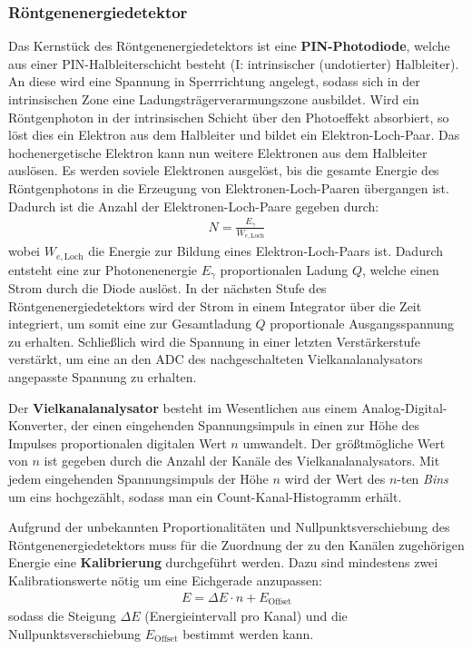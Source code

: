 \documentclass[11pt, a4paper]{article}
\begin{document}
\subsubsection{Röntgenenergiedetektor}
\label{sec:energiedetektor}

Das Kernstück des Röntgenenergiedetektors ist eine \textbf{PIN-Photodiode}, welche aus einer PIN-Halbleiterschicht besteht (I: intrinsischer (undotierter) Halbleiter).
An diese wird eine Spannung in Sperrrichtung angelegt, sodass sich in der intrinsischen Zone eine Ladungsträgerverarmungszone ausbildet.
Wird ein Röntgenphoton in der intrinsischen Schicht über den Photoeffekt absorbiert, so löst dies ein Elektron aus dem Halbleiter und bildet ein Elektron-Loch-Paar.
Das hochenergetische Elektron kann nun weitere Elektronen aus dem Halbleiter auslösen.
Es werden soviele Elektronen ausgelöst, bis die gesamte Energie des Röntgenphotons in die Erzeugung von Elektronen-Loch-Paaren übergangen ist.
Dadurch ist die Anzahl der Elektronen-Loch-Paare gegeben durch:
\begin{align}
  N = \frac{E_\gamma}{W_{e,\mathrm{Loch}}}
\end{align}
wobei $W_{e,\mathrm{Loch}}$ die Energie zur Bildung eines Elektron-Loch-Paars ist.
Dadurch entsteht eine zur Photonenenergie $E_\gamma$ proportionalen Ladung $Q$, welche einen Strom durch die Diode auslöst.
In der nächsten Stufe des Röntgenenergiedetektors wird der Strom in einem Integrator über die Zeit integriert, um somit eine zur Gesamtladung $Q$ proportionale Ausgangsspannung zu erhalten.
Schließlich wird die Spannung in einer letzten Verstärkerstufe verstärkt, um eine an den ADC des nachgeschalteten Vielkanalanalysators angepasste Spannung zu erhalten.

Der \textbf{Vielkanalanalysator} besteht im Wesentlichen aus einem Analog-Digital-Konverter, der einen eingehenden Spannungsimpuls in einen zur Höhe des Impulses proportionalen digitalen Wert $n$ umwandelt.
Der größtmögliche Wert von $n$ ist gegeben durch die Anzahl der Kanäle des Vielkanalanalysators.
Mit jedem eingehenden Spannungsimpuls der Höhe $n$ wird der Wert des $n$-ten \emph{Bins} um eins hochgezählt, sodass man ein Count-Kanal-Histogramm erhält.

Aufgrund der unbekannten Proportionalitäten und Nullpunktsverschiebung des Röntgenenergiedetektors muss für die Zuordnung der zu den Kanälen zugehörigen Energie eine \textbf{Kalibrierung} durchgeführt werden.
Dazu sind mindestens zwei Kalibrationswerte nötig um eine Eichgerade anzupassen:
\begin{align}
  E = \Delta E \cdot n + E_\mathrm{Offset}
  \label{eq:kalibrierung}
\end{align}
sodass die Steigung $\Delta E$ (Energieintervall pro Kanal) und die Nullpunktsverschiebung $E_\mathrm{Offset}$ bestimmt werden kann.
\end{document}
